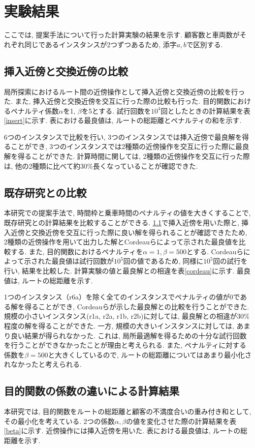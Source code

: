 \section{実験結果}
ここでは, 提案手法について行った計算実験の結果を示す.
顧客数と車両数がそれぞれ同じであるインスタンスが2つずつあるため, 添字$a,b$で区別する.

\subsection{挿入近傍と交換近傍の比較}
\label{sec:insert}
局所探索におけるルート間の近傍操作として挿入近傍と交換近傍の比較を行った. また, 挿入近傍と交換近傍を交互に行った際の比較も行った.
目的関数におけるペナルティ係数$\alpha$を1, $\beta$を5とする.
試行回数を$10^4$回としたときの計算結果を表\ref{insert}に示す.
表における最良値は, ルートの総距離とペナルティの和を示す.


6つのインスタンスで比較を行い, 3つのインスタンスでは挿入近傍で最良解を得ることができ, 3つのインスタンスでは2種類の近傍操作を交互に行った際に最良解を得ることができた. 計算時間に関しては, 2種類の近傍操作を交互に行った際は, 他の2種類に比べて約30\%長くなっていることが確認できた.
\subsection{既存研究との比較}
\label{sec:cordeau}
本研究での提案手法で, 時間枠と乗車時間のペナルティの値を大きくすることで, 既存研究との計算結果を比較することができる. \ref{sec:insert}で挿入近傍を用いた際と, 挿入近傍と交換近傍を交互に行った際に良い解を得られることが確認できたため, 2種類の近傍操作を用いて出力した解とCordeauらによって示された最良値を比較する. また, 目的関数におけるペナルティを$\alpha=1, \beta=500$とする. Cordeauらによって示された最良値は試行回数が$10^5$回の値であるため, 同様に$10^5$回の試行を行い, 結果を比較した. 計算実験の値と最良解との相違を表\ref{cordeau}に示す. 最良値は, ルートの総距離を示す.

1つのインスタンス（r6a）を除く全てのインスタンスでペナルティの値が0である解を得ることができ, Cordeauらが示した最良解との比較を行うことができた.
規模の小さいインスタンス(r1a, r2a, r1b, r2b)に対しては, 最良解との相違が30\%程度の解を得ることができた. 一方, 規模の大きいインスタンスに対しては, あまり良い結果が得られなかった. これは, 局所最適解を得るための十分な試行回数を行うことができなかったことが理由と考えられる. また, ペナルティに対する係数を$\beta=500$と大きくしているので, ルートの総距離についてはあまり最小化されなかったと考えられる.
\subsection{目的関数の係数の違いによる計算結果}
本研究では, 目的関数をルートの総距離と顧客の不満度合いの重み付き和として, その最小化を考えている. 2つの係数$\alpha, \beta$の値を変化させた際の計算結果を表\ref{beta}に示す. 近傍操作には挿入近傍を用いた. 表における最良値は, ルートの総距離を示す.

